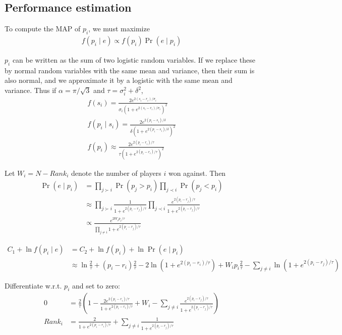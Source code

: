 \documentclass{article}
\begin{document}
\subsection{Performance estimation}

To compute the MAP of $p_i$, we must maximize
\begin{align}
f(p_i\mid e) \propto f(p_i) \Pr(e\mid p_i)
\end{align}

$p_i$ can be written as the sum of two logistic random variables. If we replace these by normal random variables with the same mean and variance, then their sum is also normal, and we approximate it by a logistic with the same mean and variance. Thus if $\alpha = \pi/\sqrt{3}$ and $\tau = \sigma_i^2 + \delta^2$,
\begin{align}
f(s_i) = \frac { 2e^{2(s_i-r_i)/\sigma_i} } { \sigma_i\left(1 + e^{2(s_i-r_i)/\sigma_i} \right)^2 }
\\f(p_i\mid s_i) = \frac { 2e^{2(p_i-s_i)/\delta} } { \delta\left(1 + e^{2(p_i-s_i)/\delta} \right)^2}
\\f(p_i) \approx \frac { 2e^{2(p_i-r_i)/\tau} } { \tau\left(1 + e^{2(p_i-r_i)/\tau} \right)^2}
\end{align}

Let $W_i = N - Rank_i$ denote the number of players $i$ won against. Then
\begin{align}
\Pr(e\mid p_i) &= \prod_{j \succ i} \Pr(p_j > p_i) \prod_{j \prec i} \Pr(p_j < p_i)
\\&\approx \prod_{j \succ i} \frac {1} {1 + e^{2(p_i-r_j)/\tau}} \prod_{j \prec i} \frac {e^{2(p_i-r_j)/\tau}} {1 + e^{2(p_i-r_j)/\tau}}
\\&\propto \frac {e^{2W_ip_i/\tau}} {\prod_{j\neq i} 1 + e^{2(p_i-r_j)/\tau}}
\end{align}

\begin{align}
C_1 + \ln f(p_i\mid e) &= C_2 + \ln f(p_i) + \ln \Pr(e\mid p_i)
\\&\approx \ln \frac{2}{\tau} + (p_i-r_i)\frac{2}{\tau} - 2\ln\left(1 + e^{2(p_i-r_i)/\tau} \right) + W_ip_i\frac{2}{\tau} - \sum_{j\neq i} \ln\left(1 + e^{2(p_i-r_j)/\tau}\right)
\end{align}

Differentiate w.r.t. $p_i$ and set to zero:
\begin{align}
0 &= \frac{2}{\tau} \left( 1 - \frac {2e^{2(p_i-r_i)/\tau}} {1 + e^{2(p_i-r_i)/\tau}} + W_i - \sum_{j\neq i} \frac {e^{2(p_i-r_j)/\tau}} {1 + e^{2(p_i-r_j)/\tau}} \right)
\\Rank_i &= \frac {2} {1 + e^{2(p_i-r_i)/\tau}} + \sum_{j\neq i} \frac {1} {1 + e^{2(p_i-r_j)/\tau}}
\end{align}
\end{document}
